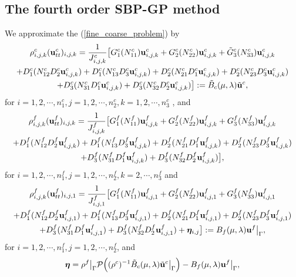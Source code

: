\documentclass[a4paper]{article}
\begin{document}
\subsection{The fourth order SBP-GP method }
We approximate the (\ref{fine_coarse_problem}) by
\begin{multline}\label{coarse_scheme}
\rho_{i,j,k}^c ({\bf u}_{tt}^c)_{i,j,k} = \frac{1}{J_{i,j,k}^c}\big[G_1^c(N_{11}^c){\bf u}_{i,j,k}^c+G_2^c(N_{22}^c){\bf u}_{i,j,k}^c+\tilde{G}_3^c(N_{33}^c){\bf u}_{i,j,k}^c\\
+D_1^c(N_{12}^cD_2^c{\bf u}_{i,j,k}^c)+D_1^c(N_{13}^cD_3^c{\bf u}_{i,j,k}^c)+D_2^c(N_{21}^cD_1^c{\bf u}_{i,j,k}^c)+D_2^c(N_{23}^cD_3^c{\bf u}_{i,j,k}^c)\\
+D_3^c(N_{31}^cD_1^c{\bf u}_{i,j,k}^c)+D_3^c(N_{32}^cD_2^c{\bf u}_{i,j,k}^c)\big] := \tilde{B}_c(\mu,\lambda) \tilde{\bf{u}}^c,
\end{multline}
for $ i = 1,2,\cdots,n_1^c, j = 1,2,\cdots,n_2^c, k = 1,2,\cdots,n_3^c$ , and 
\begin{multline}\label{fine_scheme_2}
\rho_{i,j,k}^f ({\bf u}_{tt}^f)_{i,j,k} =
 \frac{1}{J_{i,j,k}^f}\big[G_1^f(N_{11}^f){\bf u}_{i,j,k}^f+G_2^f(N_{22}^f){\bf u}_{i,j,k}^f+G_3^f(N_{33}^f){\bf u}_{i,j,k}^f\\
+D_1^f(N_{12}^fD_2^f{\bf u}_{i,j,k}^f)+D_1^f(N_{13}^fD_3^f{\bf u}_{i,j,k}^f)
+D_2^f(N_{21}^fD_1^f{\bf u}_{i,j,k}^f)+D_2^f(N_{23}^fD_3^f{\bf u}_{i,j,k}^f)\\
+D_3^f(N_{31}^fD_1^f{\bf u}_{i,j,k}^f)
+D_3^f(N_{32}^fD_2^f{\bf u}_{i,j,k}^f)\big],
\end{multline}
for $ i = 1,2,\cdots,n_1^f, j = 1,2,\cdots,n_2^f, k = 2,\cdots,n_3^f$ and
\begin{multline}\label{fine_scheme_1}
\rho_{i,j,k}^f ({\bf u}_{tt}^f)_{i,j,1} = \frac{1}{J_{i,j,1}^f}\big[G_1^f(N_{11}^f){\bf u}_{i,j,1}^f+G_2^f(N_{22}^f){\bf u}_{i,j,1}^f+G_3^f(N_{33}^f){\bf u}_{i,j,1}^f\\
+D_1^f(N_{12}^fD_2^f{\bf u}_{i,j,1}^f)+D_1^f(N_{13}^fD_3^f{\bf u}_{i,j,1}^f)+D_2^f(N_{21}^fD_1^f{\bf u}_{i,j,1}^f)+D_2^f(N_{23}^fD_3^f{\bf u}_{i,j,1}^f)\\
+D_3^f(N_{31}^fD_1^f{\bf u}_{i,j,1}^f)+D_3^f(N_{32}^fD_2^f{\bf u}_{i,j,1}^f)+{\bm \eta}_{i,j}\big] := B_f(\mu,\lambda){\bf u}^f\big|_\Gamma,
\end{multline}
for $ i = 1,2,\cdots,n_1^f, j = 1,2,\cdots,n_2^f$, and
\begin{equation*}
{\bm \eta} = \rho^f\big|_\Gamma\mathcal{P}\Big((\rho^c)^{-1}\tilde{B}_c(\mu,\lambda)\tilde{\bf u}^c\big|_\Gamma\Big)-B_f(\mu,\lambda){\bf u}^f\big|_\Gamma,
\end{equation*}
\end{document}
